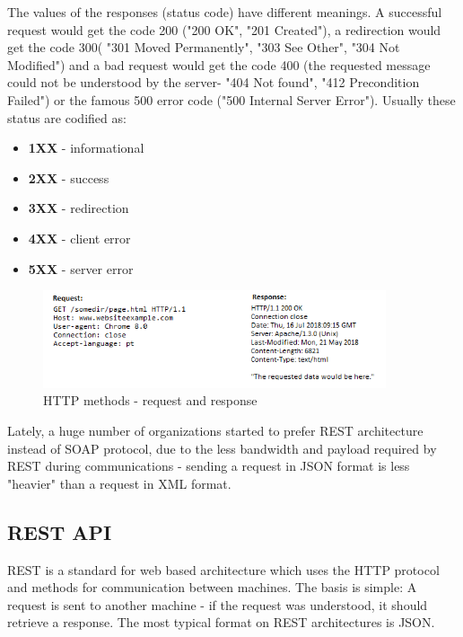 \documentclass[mim_thesis.tex]{subfiles}
\begin{document}
The values of the responses (status code) have different meanings. A successful request would get the code 200 ("200 OK", "201 Created"), a redirection would get the code 300( "301 Moved Permanently", "303 See Other", "304 Not Modified") and a bad request would get the code 400 (the requested message could not be understood by the server- "404 Not found", "412 Precondition Failed") or the famous 500 error code ("500 Internal Server Error"). \citep{sundvall2013applying} Usually these status are codified as:

\begin{itemize}[noitemsep]
\item \textbf{1XX} - informational
\item \textbf{2XX} - success
\item \textbf{3XX} - redirection
\item \textbf{4XX} - client error
\item \textbf{5XX} - server error
\end{itemize}



\begin{figure}[H]
	\centering
    \includegraphics[width=0.9\textwidth]{img/http_request_reply.PNG}
	\caption{HTTP methods - request and response}
	\label{fig:http_request_reply}
\end{figure}

Lately, a huge number of organizations started to prefer REST architecture instead of SOAP protocol, due to the less bandwidth and payload required by REST during communications - sending a request in JSON format is less "heavier" than a request in XML format.

\subsection{REST API}
REST is a standard for web based architecture which uses the HTTP protocol and methods for communication between machines. The basis is simple: A request is sent to another machine - if the request was understood, it should retrieve a response. The most typical format on REST architectures is JSON.
\end{document}
